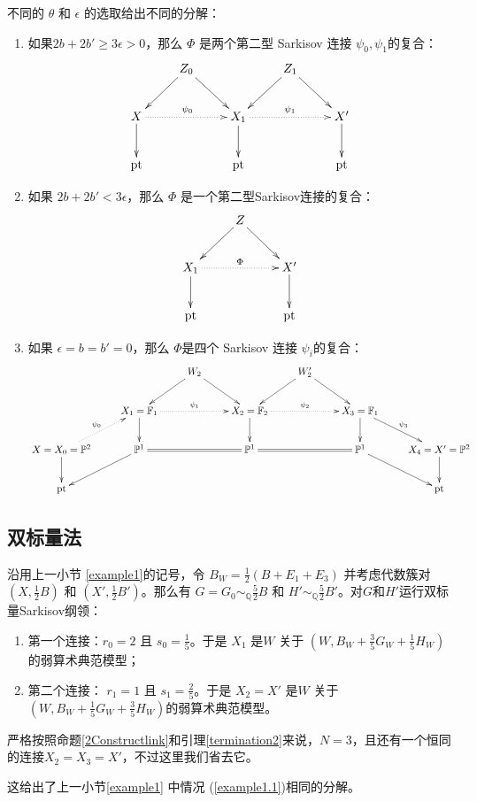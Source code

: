 不同的 $\theta$ 和  $\epsilon$ 的选取给出不同的分解：
\begin{enumerate}
  \item\label{example1.1} 如果$ 2b+2b'\geqslant 3\epsilon>0 $，那么  $\Phi$ 是两个第二型 Sarkisov 连接 $\psi_{0},\psi_{1}$的复合： 
    \[ \xymatrix{
        &Z_{0}\ar[rd]\ar[ld] & &Z_{1}\ar[rd]\ar[ld]\\
        X\ar[d]\ar@{.>}[rr]^{\psi_{0}}& &X_{1}\ar@{.>}[rr]^{\psi_{1}}\ar[d]&&X'\ar[d]\\
        \text{pt}&&\text{pt}&&\text{pt} } \]
  \item 如果 $ 2b+2b'< 3\epsilon $，那么 $\Phi$ 是一个第二型Sarkisov连接的复合：
        \[ \xymatrix{
            &Z\ar[rd]\ar[ld] & \\
            X_{1}\ar@{.>}[rr]^{\Phi}\ar[d]& &X'\ar[d]\\
            \text{pt}&&\text{pt} } \]
  \item 如果 $ \epsilon=b=b'=0 $，那么 $\Phi$是四个 Sarkisov 连接 $\psi_{i}$的复合：
        \[ \xymatrix{
          &&W_2\ar[ld]\ar[rd]&&W_2'\ar[ld]\ar[rd]\\
          &X_1=\mathbb{F}_1\ar@{.>}[rr]^{\psi_{1}}\ar[d]&&X_2=\mathbb{F}_2\ar@{.>}[rr]^{\psi_{2}}\ar[d]&&X_3=\mathbb{F}_1\ar[d]\ar[rd]^{\psi_{3}}\\
          X=X_0=\mathbb{P}^2\ar[d]\ar@{.>}[ru]^{\psi_{0}}&\mathbb{P}^1\ar[ld]\ar@{=}[rr]&&\mathbb{P}^1\ar@{=}[rr]&&\mathbb{P}^1\ar[rd]&X_4=X'=\mathbb{P}^2\ar[d]\\
          \text{pt}&&&&&&\text{pt} } \]
\end{enumerate}

\subsection{双标量法}
沿用上一小节 \ref{example1}的记号，令 $B_{W}=\frac{1}{2}(B+E_{1}+E_{3})$ 并考虑代数簇对 $(X,\frac{1}{2}B)$ 和 $(X',\frac{1}{2}B')$。那么有 $G=G_{0}\sim_{\mathbb{Q}}\frac{5}{2}B$ 和 $H'\sim_{\mathbb{Q}}\frac{5}{2}B'$。对$G$和$H'$运行双标量Sarkisov纲领：
\begin{enumerate}
  \item 第一个连接：$r_{0}=2$ 且 $s_{0}=\frac{1}{5}$。于是 $X_{1}$ 是$W$  关于 $(W,B_{W}+\frac{3}{5}G_{W}+\frac{1}{5}H_{W})$的弱算术典范模型；
  \item 第二个连接： $r_{1}=1$ 且 $s_{1}=\frac{2}{5}$。于是 $X_{2}= X'$ 是$W$ 关于  $(W,B_{W}+\frac{1}{5}G_{W}+\frac{3}{5}H_{W})$的弱算术典范模型。
\end{enumerate}
\begin{remark}
严格按照命题\ref{2Constructlink}和引理\ref{termination2}来说，$N=3 $，且还有一个恒同的连接$X_{2}=X_{3}=X' $，不过这里我们省去它。
\end{remark}
\begin{remark}
  这给出了上一小节\ref{example1} 中情况 (\ref{example1.1})相同的分解。
\end{remark}

